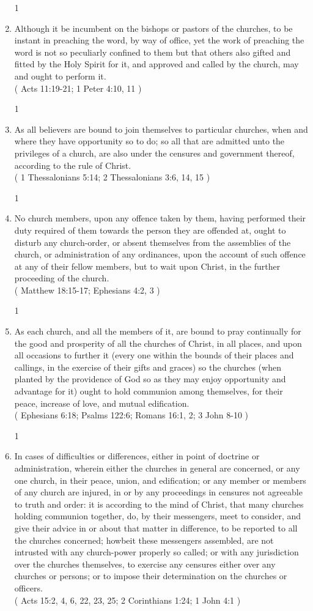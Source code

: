 \documentclass[12pt,a4paper]{book}
\begin{document}
\begin{enumerate}
1\item Although it be incumbent on the bishops or pastors of the churches, to be instant in preaching the word, by way of office, yet the work of preaching the word is not so peculiarly confined to them but that others also gifted and fitted by the Holy Spirit for it, and approved and called by the church, may and ought to perform it.\\
( Acts 11:19-21; 1 Peter 4:10, 11 )

1\item As all believers are bound to join themselves to particular churches, when and where they have opportunity so to do; so all that are admitted unto the privileges of a church, are also under the censures and government thereof, according to the rule of Christ.\\
( 1 Thessalonians 5:14; 2 Thessalonians 3:6, 14, 15 )

1\item No church members, upon any offence taken by them, having performed their duty required of them towards the person they are offended at, ought to disturb any church-order, or absent themselves from the assemblies of the church, or administration of any ordinances, upon the account of such offence at any of their fellow members, but to wait upon Christ, in the further proceeding of the church.\\
( Matthew 18:15-17; Ephesians 4:2, 3 )

1\item As each church, and all the members of it, are bound to pray continually for the good and prosperity of all the churches of Christ, in all places, and upon all occasions to further it (every one within the bounds of their places and callings, in the exercise of their gifts and graces) so the churches (when planted by the providence of God so as they may enjoy opportunity and advantage for it) ought to hold communion among themselves, for their peace, increase of love, and mutual edification.\\
( Ephesians 6:18; Psalms 122:6; Romans 16:1, 2; 3 John 8-10 )

1\item In cases of difficulties or differences, either in point of doctrine or administration, wherein either the churches in general are concerned, or any one church, in their peace, union, and edification; or any member or members of any church are injured, in or by any proceedings in censures not agreeable to truth and order: it is according to the mind of Christ, that many churches holding communion together, do, by their messengers, meet to consider, and give their advice in or about that matter in difference, to be reported to all the churches concerned; howbeit these messengers assembled, are not intrusted with any church-power properly so called; or with any jurisdiction over the churches themselves, to exercise any censures either over any churches or persons; or to impose their determination on the churches or officers.\\
( Acts 15:2, 4, 6, 22, 23, 25; 2 Corinthians 1:24; 1 John 4:1 )
\end{enumerate}
\end{document}
